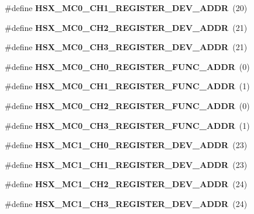 \begin{DoxyCompactItemize}
\item 
\#define {\bfseries H\+S\+X\+\_\+\+M\+C0\+\_\+\+C\+H1\+\_\+\+R\+E\+G\+I\+S\+T\+E\+R\+\_\+\+D\+E\+V\+\_\+\+A\+D\+DR}~(20)\label{types_8h_ac66829c4c41afd34d9d0544e29a0e928}

\item 
\#define {\bfseries H\+S\+X\+\_\+\+M\+C0\+\_\+\+C\+H2\+\_\+\+R\+E\+G\+I\+S\+T\+E\+R\+\_\+\+D\+E\+V\+\_\+\+A\+D\+DR}~(21)\label{types_8h_a22c6d67f1ee7817e813715f94ca7a73c}

\item 
\#define {\bfseries H\+S\+X\+\_\+\+M\+C0\+\_\+\+C\+H3\+\_\+\+R\+E\+G\+I\+S\+T\+E\+R\+\_\+\+D\+E\+V\+\_\+\+A\+D\+DR}~(21)\label{types_8h_a53794d5b5631c9a1e7ebe9809a5c3993}

\item 
\#define {\bfseries H\+S\+X\+\_\+\+M\+C0\+\_\+\+C\+H0\+\_\+\+R\+E\+G\+I\+S\+T\+E\+R\+\_\+\+F\+U\+N\+C\+\_\+\+A\+D\+DR}~(0)\label{types_8h_ac3f40f3476190aec6996e1ffd1da3c18}

\item 
\#define {\bfseries H\+S\+X\+\_\+\+M\+C0\+\_\+\+C\+H1\+\_\+\+R\+E\+G\+I\+S\+T\+E\+R\+\_\+\+F\+U\+N\+C\+\_\+\+A\+D\+DR}~(1)\label{types_8h_a5690c21a52958fe28e7871189d547280}

\item 
\#define {\bfseries H\+S\+X\+\_\+\+M\+C0\+\_\+\+C\+H2\+\_\+\+R\+E\+G\+I\+S\+T\+E\+R\+\_\+\+F\+U\+N\+C\+\_\+\+A\+D\+DR}~(0)\label{types_8h_ae4a27dd0916339108858f7bdbd326e91}

\item 
\#define {\bfseries H\+S\+X\+\_\+\+M\+C0\+\_\+\+C\+H3\+\_\+\+R\+E\+G\+I\+S\+T\+E\+R\+\_\+\+F\+U\+N\+C\+\_\+\+A\+D\+DR}~(1)\label{types_8h_ad76e5a152d2d76ace9bac013487e664e}

\item 
\#define {\bfseries H\+S\+X\+\_\+\+M\+C1\+\_\+\+C\+H0\+\_\+\+R\+E\+G\+I\+S\+T\+E\+R\+\_\+\+D\+E\+V\+\_\+\+A\+D\+DR}~(23)\label{types_8h_a57e3b1424a04c402463db9cca9323c1b}

\item 
\#define {\bfseries H\+S\+X\+\_\+\+M\+C1\+\_\+\+C\+H1\+\_\+\+R\+E\+G\+I\+S\+T\+E\+R\+\_\+\+D\+E\+V\+\_\+\+A\+D\+DR}~(23)\label{types_8h_a9d46ab436c323c909918a3287c1c4c7f}

\item 
\#define {\bfseries H\+S\+X\+\_\+\+M\+C1\+\_\+\+C\+H2\+\_\+\+R\+E\+G\+I\+S\+T\+E\+R\+\_\+\+D\+E\+V\+\_\+\+A\+D\+DR}~(24)\label{types_8h_aa125c331d375c1164ae6a616eec31014}

\item 
\#define {\bfseries H\+S\+X\+\_\+\+M\+C1\+\_\+\+C\+H3\+\_\+\+R\+E\+G\+I\+S\+T\+E\+R\+\_\+\+D\+E\+V\+\_\+\+A\+D\+DR}~(24)\label{types_8h_a2ef6fa583fd69484b2128c682554cfab}


\end{DoxyCompactItemize}
